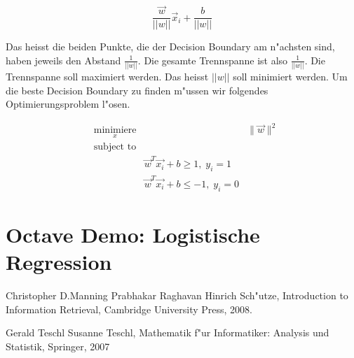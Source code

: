 \documentclass[12pt,a4paper,twoside]{article}
\begin{document}
\[
\frac{\vec w}{||w||} \vec x_i + \frac{b}{||w||}
\]

Das heisst die beiden Punkte, die der Decision Boundary am n"achsten sind, haben jeweils den Abstand $\frac{1}{||w||}$. Die gesamte Trennspanne ist also $\frac{1}{||w||}$. Die Trennspanne soll maximiert werden. Das heisst $||w||$ soll minimiert werden. Um die beste Decision Boundary zu finden m"ussen wir folgendes Optimierungsproblem l"osen.

 \begin{equation*}
\begin{aligned}
& \underset{x}{\text{minimiere}}
& & \lVert \vec w \rVert^2 \\
& \text{subject to}\\
& & \vec{w}^T \vec{x_i} + b \geq 1, \; y_i = 1 \\
& & \vec{w}^T \vec{x_i} + b \leq -1, \;  y_i = 0
\end{aligned}
\end{equation*}

\appendix

\section{Octave Demo: Logistische Regression}
\label{sec:code}



\begin{thebibliography}{99}
Christopher D.Manning Prabhakar Raghavan Hinrich Sch"utze,
Introduction to Information Retrieval,
Cambridge University Press,
2008.

Gerald Teschl Susanne Teschl,
Mathematik f"ur Informatiker: Analysis und Statistik,
Springer,
2007
\end{thebibliography}
\end{document}
